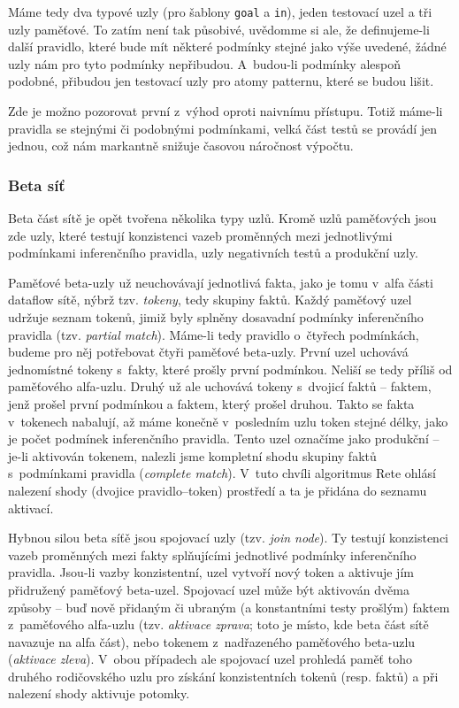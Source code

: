 Máme tedy dva typové uzly (pro šablony \verb|goal| a \verb|in|), jeden
testovací uzel a tři uzly paměťové. To zatím není tak působivé,
uvědomme si ale, že definujeme-li další pravidlo, které bude mít
některé podmínky stejné jako výše uvedené, žádné uzly nám pro tyto
podmínky nepřibudou. A~budou-li podmínky alespoň podobné, přibudou
jen testovací uzly pro atomy patternu, které se budou lišit.

Zde je možno pozorovat první z~výhod oproti naivnímu přístupu. Totiž
máme-li pravidla se stejnými či podobnými podmínkami, velká část testů
se provádí jen jednou, což nám markantně snižuje časovou náročnost výpočtu.
\subsubsection{Beta síť}
Beta část sítě je opět tvořena několika typy uzlů. Kromě uzlů paměťových
jsou zde uzly, které testují konzistenci vazeb proměnných mezi jednotlivými
podmínkami inferenčního pravidla, uzly negativních testů a produkční uzly.

Paměťové beta-uzly už neuchovávají jednotlivá fakta, jako je tomu v~alfa
části dataflow sítě, nýbrž tzv. \emph{tokeny}, tedy skupiny faktů. Každý
paměťový uzel udržuje seznam tokenů, jimiž byly splněny dosavadní podmínky
inferenčního pravidla (tzv. \emph{partial match}). Máme-li tedy pravidlo
o~čtyřech podmínkách, budeme pro něj potřebovat čtyři paměťové beta-uzly.
První uzel uchovává jednomístné tokeny s~fakty, které prošly první podmínkou.
Neliší se tedy příliš od paměťového alfa-uzlu. Druhý už ale uchovává tokeny
s~dvojicí faktů -- faktem, jenž prošel první podmínkou a faktem, který prošel
druhou. Takto se fakta v~tokenech nabalují, až máme konečně v~posledním uzlu
token stejné délky, jako je počet podmínek inferenčního pravidla. Tento uzel
označíme jako produkční -- je-li aktivován tokenem, nalezli jsme kompletní
shodu skupiny faktů s~podmínkami pravidla (\emph{complete match}). V~tuto chvíli
algoritmus Rete ohlásí nalezení shody (dvojice pravidlo--token) prostředí
a ta je přidána do seznamu aktivací.

Hybnou silou beta síťě jsou spojovací uzly (tzv. \emph{join node}). Ty
testují konzistenci vazeb proměnných mezi fakty splňujícími jednotlivé
podmínky inferenčního pravidla. Jsou-li vazby konzistentní, uzel vytvoří
nový token a aktivuje jím přidružený paměťový beta-uzel. Spojovací uzel
může být aktivován dvěma způsoby -- buď nově přidaným či ubraným
(a konstantními testy prošlým) faktem z~paměťového alfa-uzlu (tzv.
\emph{aktivace zprava}; toto je místo, kde beta část sítě navazuje na alfa
část), nebo tokenem z~nadřazeného paměťového beta-uzlu (\emph{aktivace
zleva}). V~obou případech ale spojovací uzel prohledá paměť toho
druhého rodičovského uzlu pro získání konzistentních tokenů (resp. faktů)
a při nalezení shody aktivuje potomky.

